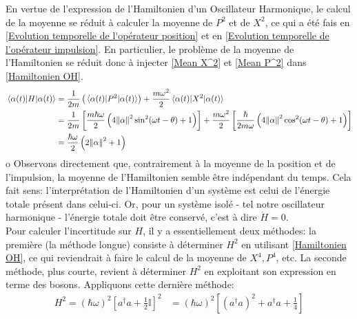 \documentclass[11pt,oneside,a4paper]{article}
\newcommand{\h}{\ensuremath{\hbar}}
\begin{document}
En vertue de l'expression de l'Hamiltonien d'un Oscillateur Harmonique, le calcul de la moyenne se réduit à calculer la moyenne de $P^2$ et de $X^2$, ce qui a été fais en \ref{Evolution temporelle de l'opérateur position} et en \ref{Evolution temporelle de l'opérateur impulsion}. En particulier, le problème de la moyenne de l'Hamiltonien se réduit donc à injecter \eqref{Mean X^2} et \eqref{Mean P^2} dans \eqref{Hamiltonien OH}.
\begin{align}
  \expval{H}{\alpha(t)} &= \frac{1}{2m}\left(\expval{P^2}{\alpha(t)}\right) + \frac{m\omega^2}{2}\expval{X^2}{\alpha(t)}\\
  &= \frac{1}{2m} \left[\frac{m\h\omega}{2}\left(4\norm{\alpha}^2\sin^2(\omega t-\theta)+1\right)\right] + \frac{m\omega^2}{2}\left[\frac{\h}{2m\omega}\left(4\norm{\alpha}^2\cos^2(\omega t-\theta)+1\right)\right]\\
  &= \frac{\h\omega}{2}\left(2\norm{\alpha}^2+1\right)
\end{align}o
Observons directement que, contrairement à la moyenne de la position et de l'impulsion, la moyenne de l'Hamiltonien semble être indépendant du temps. Cela fait sens: l'interprétation de l'Hamiltonien d'un système est celui de l'énergie totale présent dans celui-ci. Or, pour un système isolé - tel notre oscillateur harmonique - l'énergie totale doit être conservé, c'est à dire $\dot{H} = 0$.\\

Pour calculer l'incertitude sur $H$, il y a essentiellement deux méthodes: la première (la méthode longue) consiste à déterminer $H^2$ en utilisant \eqref{Hamiltonien OH}, ce qui reviendrait à faire le calcul de la moyenne de $X^4,P^4$, etc. La seconde méthode, plus courte, revient à déterminer $H^2$ en exploitant son expression en terme des bosons. Appliquons cette dernière méthode:
\begin{align}
  H^2 = \left(\h\omega\right)^2\left[a^\dagger a+\frac{1}{2}\mathbb{I}\right]^2 &= \left(\h\omega\right)^2\left[\left(a^\dagger a\right)^2+a^\dagger a+\frac{1}{4}\right]
\end{align}
\end{document}
